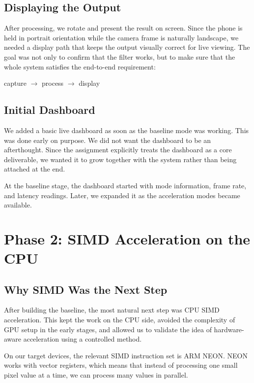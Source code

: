 \documentclass[12pt,a4paper]{article}
\begin{document}
\subsection{Displaying the Output}

After processing, we rotate and present the result on screen. Since the phone is held in portrait orientation while the camera frame is naturally landscape, we needed a display path that keeps the output visually correct for live viewing. The goal was not only to confirm that the filter works, but to make sure that the whole system satisfies the end-to-end requirement:

\begin{center}
capture $\rightarrow$ process $\rightarrow$ display
\end{center}

\subsection{Initial Dashboard}

We added a basic live dashboard as soon as the baseline mode was working. This was done early on purpose. We did not want the dashboard to be an afterthought. Since the assignment explicitly treats the dashboard as a core deliverable, we wanted it to grow together with the system rather than being attached at the end.

At the baseline stage, the dashboard started with mode information, frame rate, and latency readings. Later, we expanded it as the acceleration modes became available.

\section{Phase 2: SIMD Acceleration on the CPU}

\subsection{Why SIMD Was the Next Step}

After building the baseline, the most natural next step was CPU SIMD acceleration. This kept the work on the CPU side, avoided the complexity of GPU setup in the early stages, and allowed us to validate the idea of hardware-aware acceleration using a controlled method.

On our target devices, the relevant SIMD instruction set is ARM NEON. NEON works with vector registers, which means that instead of processing one small pixel value at a time, we can process many values in parallel.
\end{document}
